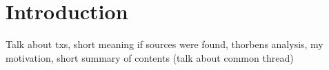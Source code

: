 \chapter{Introduction}
Talk about txs, short meaning if sources were found, thorbens analysis, my motivation, short summary of contents (talk about common thread)
